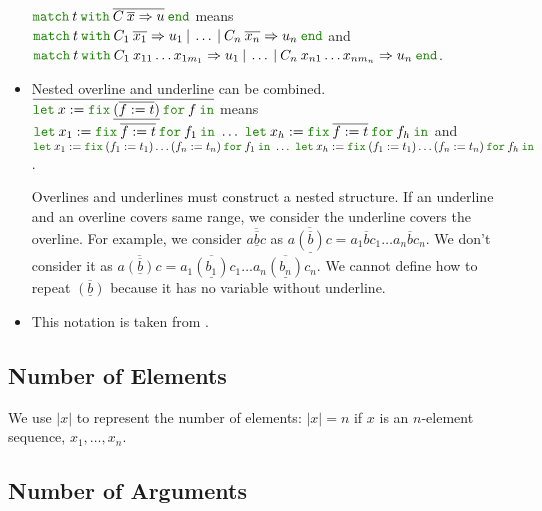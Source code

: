 \documentclass[a4paper,fleqn]{article}
\newcommand{\kwlet}{\mbox{\color{mygreen}\ttfamily let}}
\newcommand{\kwin}{\mbox{\color{mygreen}\ttfamily in}}
\newcommand{\kwmatch}{\mbox{\color{mygreen}\ttfamily match}}
\newcommand{\kwwith}{\mbox{\color{mygreen}\ttfamily with}}
\newcommand{\kwend}{\mbox{\color{mygreen}\ttfamily end}}
\newcommand{\kwfix}{\mbox{\color{mygreen}\ttfamily fix}}
\newcommand{\kwfor}{\mbox{\color{mygreen}\ttfamily for}}
\newcommand{\letinB}[2]{\kwlet\:#1:=#2\:\kwin}
\newcommand{\omatch}[2]{\kwmatch\:#1\:\kwwith\:{#2}\:\kwend}
\newcommand{\ofix}[2]{\kwfix\:{#1}\:\kwfor\:{#2}}
\newcommand{\rep}[1]{\overline{#1}}
\begin{document}
\begin{itemize}
    $\omatch{t}{\rep{C\:\rep{x}\Rightarrow u}}$ means \\
    $\omatch{t}{C_1\:\rep{x_1}\Rightarrow u_1 \:|\: \ldots \:|\: C_n\:\rep{x_n}\Rightarrow u_n}$ and \\
    $\omatch{t}{C_1\: x_{11}\ldots x_{1m_1} \Rightarrow u_1
                \:|\: \ldots
                \:|\: C_n\: x_{n1}\ldots x_{nm_n} \Rightarrow u_n}$.
  \item Nested overline and underline can be combined. \\
    $\rep{\letinB{x}{\ofix{\underline{(\rep{f:=t})}}{f}}}$ means \\
    $\letinB{x_1}{\ofix{\rep{f:=t}}{f_1}} ~\ldots~
     \letinB{x_h}{\ofix{\rep{f:=t}}{f_h}}$ and \\
    $\letinB{x_1}{\ofix{(f_1:=t_1)\ldots(f_n:=t_n)}{f_1}} ~\ldots~
     \letinB{x_h}{\ofix{(f_1:=t_1)\ldots(f_n:=t_n)}{f_h}}$.

    Overlines and underlines must construct a nested structure.
    If an underline and an overline covers same range,
    we consider the underline covers the overline.
    For example,
    we consider $\rep{a \rep{\underline{b}} c}$ as
    $\rep{a \underline{(\rep{b})} c} = a_1 \rep{b} c_1 \ldots a_n \rep{b} c_n$.
    We don't consider it as
    $\rep{a \rep{(\underline{b})} c} = a_1 \rep{(\underline{b_1})} c_1 \ldots a_n \rep{(\underline{b_n})} c_n$.
    We cannot define how to repeat $\rep{(\underline{b})}$ because it has no variable without underline.

  \item This notation is taken from \cite{steele2017s}.
\end{itemize}

\subsection{Number of Elements}

We use $|x|$ to represent the number of elements: $|x|=n$ if $x$ is an $n$-element sequence, $x_1, \ldots, x_n$.

\subsection{Number of Arguments}
\end{document}
